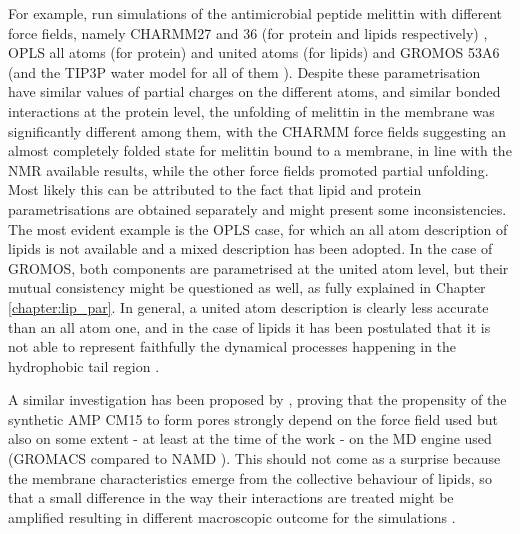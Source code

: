 For example, \citet{Wang2014} run simulations of the antimicrobial peptide melittin with different force fields, namely CHARMM27 and 36 (for protein and lipids respectively) \citep{MacKerell1998,Klauda2010}, OPLS all atoms (for protein) and united atoms (for lipids) \citep{Jorgensen1996} and GROMOS 53A6 \citep{Oostenbrink2004} (and the TIP3P water model for all of them \citep{Jorgensen1983}).
%
Despite these parametrisation have similar values of partial charges on the different atoms, and similar bonded interactions at the protein level, the unfolding of melittin in the membrane was significantly different among them, with the CHARMM force fields suggesting an almost completely folded state for melittin bound to a membrane, in line with the NMR available results, while the other force fields promoted partial unfolding. Most likely this can be attributed to the fact that lipid and protein parametrisations are obtained separately and might present some inconsistencies. The most evident example is the OPLS case, for which an all atom description of lipids is not available and a mixed description has been adopted. In the case of GROMOS, both components are parametrised at the united atom level, but their mutual consistency might be questioned as well, as fully explained in Chapter \ref{chapter:lip_par}. In general, a united atom description is clearly less accurate than an all atom one, and in the case of lipids it has been postulated that it is not able to represent faithfully the dynamical processes happening in the hydrophobic tail region \citep{Chowdhary2013}.

A similar investigation has been proposed by \citet{Bennett2016}, proving that the propensity of the synthetic AMP CM15 to form pores strongly depend on the force field used but also on some extent - at least at the time of the work - on the MD engine used (GROMACS compared to NAMD \citep{Phillips2005}). This should not come as a surprise because the membrane characteristics emerge from the collective behaviour of lipids, so that a small difference in the way their interactions are treated might be amplified resulting in different macroscopic outcome for the simulations \citep{Reisser2017}.

